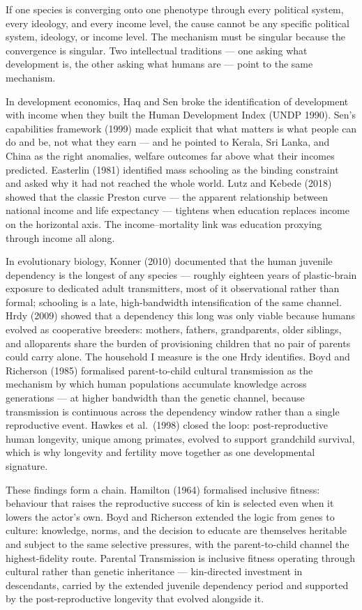 \documentclass[12pt,letterpaper]{article}
\begin{document}
If one species is converging onto one phenotype through every
political system, every ideology, and every income level, the cause
cannot be any specific political system, ideology, or income level.
The mechanism must be singular because the convergence is singular.
Two intellectual traditions --- one asking what development is, the
other asking what humans are --- point to the same mechanism.

In development economics, Haq and Sen broke the identification of
development with income when they built the Human Development Index
(UNDP 1990). Sen's capabilities framework (1999) made explicit that
what matters is what people can do and be, not what they earn --- and
he pointed to Kerala, Sri Lanka, and China as the right anomalies,
welfare outcomes far above what their incomes predicted. Easterlin
(1981) identified mass schooling as the binding constraint and asked
why it had not reached the whole world. Lutz and Kebede (2018) showed
that the classic Preston curve --- the apparent relationship between
national income and life expectancy --- tightens when education
replaces income on the horizontal axis. The income--mortality link
was education proxying through income all along.

In evolutionary biology, Konner (2010) documented that the human
juvenile dependency is the longest of any species --- roughly
eighteen years of plastic-brain exposure to dedicated adult
transmitters, most of it observational rather than formal; schooling
is a late, high-bandwidth intensification of the same channel. Hrdy
(2009) showed that a dependency this long was only viable because
humans evolved as cooperative breeders: mothers, fathers,
grandparents, older siblings, and alloparents share the burden of
provisioning children that no pair of parents could carry alone. The
household I measure is the one Hrdy identifies. Boyd and
Richerson (1985) formalised parent-to-child cultural transmission as
the mechanism by which human populations accumulate knowledge across
generations --- at higher bandwidth than the genetic channel, because
transmission is continuous across the dependency window rather than
a single reproductive event. Hawkes et al.\ (1998) closed the loop:
post-reproductive human longevity, unique among primates, evolved to
support grandchild survival, which is why longevity and fertility
move together as one developmental signature.

These findings form a chain. Hamilton (1964) formalised inclusive
fitness: behaviour that raises the reproductive success of kin is
selected even when it lowers the actor's own. Boyd and Richerson
extended the logic from genes to culture: knowledge, norms, and the
decision to educate are themselves heritable and subject to the same
selective pressures, with the parent-to-child channel the
highest-fidelity route. Parental Transmission is inclusive fitness
operating through cultural rather than genetic inheritance ---
kin-directed investment in descendants, carried by the extended
juvenile dependency period and supported by the post-reproductive
longevity that evolved alongside it.
\end{document}
